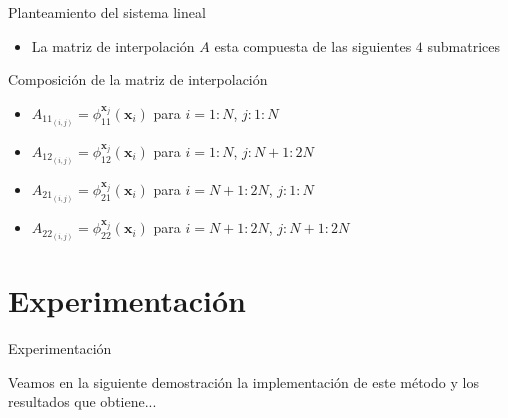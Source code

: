 \documentclass{beamer}
\begin{document}
\begin{frame}{Planteamiento del sistema lineal}
\begin{itemize}
  \item La matriz de interpolación $A$ esta compuesta de las siguientes $4$ submatrices  
\end{itemize}

\begin{block}{Composición de la matriz de interpolación}
  \begin{itemize}
    \item $A_{11_{(i,j)}} = \phi_{11}^{\mathbf{x}_j}(\mathbf{x}_i)$ para $i=1:N$, $j:1:N$
    \item $A_{12_{(i,j)}} = \phi_{12}^{\mathbf{x}_j}(\mathbf{x}_i)$ para $i=1:N$, $j:N+1:2N$
    \item $A_{21_{(i,j)}} = \phi_{21}^{\mathbf{x}_j}(\mathbf{x}_i)$ para $i=N+1:2N$, $j:1:N$
    \item $A_{22_{(i,j)}} = \phi_{22}^{\mathbf{x}_j}(\mathbf{x}_i)$ para $i=N+1:2N$, $j:N+1:2N$
  \end{itemize}
\end{block}
 
\end{frame}


\section{Experimentación}

\begin{frame}{Experimentación}
 
\begin{example}
  Veamos en la siguiente demostración la implementación de este método y los resultados que obtiene...
\end{example}
\end{frame}




\end{document}
